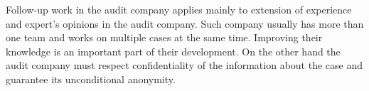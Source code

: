 Follow-up work in the audit company applies mainly to extension of experience and expert's opinions in the audit company. Such company usually has more than one team and works on multiple cases at the same time. Improving their knowledge is an important part of their development. On the other hand the audit company must respect confidentiality of the information about the case and guarantee its unconditional anonymity.


%

 
